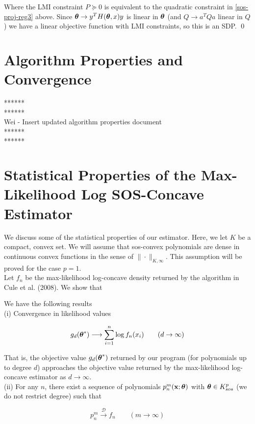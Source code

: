 \documentclass[11pt,reqno]{amsart}
\numberwithin{equation}{section}
\begin{document}
Where the LMI constraint $P \succeq 0$ is equivalent to the quadratic constraint in \eqref{sos-proj-reg3} above. Since ${\boldsymbol\theta} \rightarrow y^T H({\boldsymbol\theta}, x) y$ is linear in ${\boldsymbol\theta}$ (and $Q \to a^T Q a$ linear in $Q$) we have a linear objective function with LMI constraints, so this is an SDP. \qed 

\section{Algorithm Properties and Convergence} 

******\\
******\\

Wei - Insert updated algorithm properties document \\

******\\
******\\

\section{Statistical Properties of the Max-Likelihood Log SOS-Concave Estimator} 

We discuss some of the statistical properties of our estimator. Here, we let $K$ be a compact, convex set. We will assume that sos-convex polynomials are dense in continuous convex functions in the sense of $\| \cdot \|_{K, \infty}$. This assumption will be proved for the case $p =1$. \\

Let $f_n$ be the max-likelihood log-concave density returned by the algorithm in Cule et al. (2008). We show that 

\begin{theorem} \label{stat-prop} We have the following results \\

(i) Convergence in likelihood values 

\begin{equation} \label{stat-obj-val}
g_d({\boldsymbol\theta}^*) \longrightarrow \sum_{i = 1}^n \log f_n(x_i) \qquad (d \rightarrow \infty) 
\end{equation}

That is, the objective value $g_d({\boldsymbol\theta}^*)$ returned by our program (for polynomials up to degree $d$) approaches the objective value returned by the max-likelihood log-concave estimator as $d \to \infty$.\\

(ii) For any $n$, there exist a sequence of polynomials $p_n^m({\bf x}; {\boldsymbol\theta})$ with ${\boldsymbol\theta} \in K_{sos}^p$ (we do not restrict degree) such that 

\begin{equation} \label{stat-distr}
p_n^m\overset{\mathcal{D}}{\longrightarrow} f_n \qquad (m \to \infty) 
\end{equation}
\end{theorem}
\end{document}
